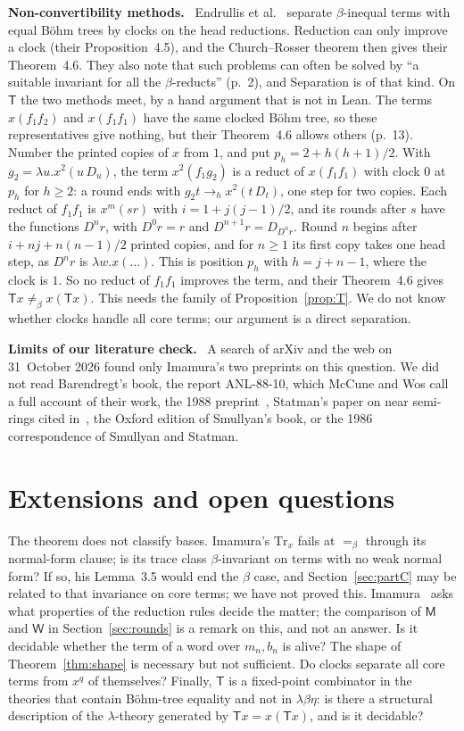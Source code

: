 \documentclass[a4paper,english]{lipics-v2021}
\newcommand{\M}{\mathsf{M}}
\newcommand{\W}{\mathsf{W}}
\newcommand{\T}{\mathsf{T}}
\newcommand{\hred}{\to_{h}}
\newcommand{\eqb}{=_{\beta}}
\newcommand{\neqb}{\neq_{\beta}}
\newcommand{\Dd}[1]{D_{#1}}
\newcommand{\runin}[1]{\par\smallskip\noindent\textbf{#1}\ }
\begin{document}
\runin{Non-convertibility methods.} Endrullis et al.~\cite{endrullis} separate $\beta$-inequal terms with equal Böhm trees by clocks on the head reductions. Reduction can only improve a clock (their Proposition~4.5), and the Church--Rosser theorem then gives their Theorem~4.6. They also note that such problems can often be solved by ``a suitable invariant for all the $\beta$-reducts'' (p.~2), and Separation is of that kind. On $\T$ the two methods meet, by a hand argument that is not in Lean. The terms $x(f_1f_2)$ and $x(f_1f_1)$ have the same clocked Böhm tree, so these representatives give nothing, but their Theorem~4.6 allows others (p.~13). Number the printed copies of $x$ from $1$, and put $p_h = 2+h(h+1)/2$. With $g_2 = \lambda u.x^2(u\,\Dd{u})$, the term $x^2(f_1g_2)$ is a reduct of $x(f_1f_1)$ with clock $0$ at $p_h$ for $h \geq 2$: a round ends with $g_2t \hred x^2(t\,\Dd{t})$, one step for two copies. Each reduct of $f_1f_1$ is $x^m(sr)$ with $i = 1+j(j-1)/2$, and its rounds after $s$ have the functions $D^nr$, with $D^0r = r$ and $D^{n+1}r = \Dd{D^nr}$. Round $n$ begins after $i+nj+n(n-1)/2$ printed copies, and for $n \geq 1$ its first copy takes one head step, as $D^nr$ is $\lambda w.x(\ldots)$. This is position $p_h$ with $h = j+n-1$, where the clock is $1$. So no reduct of $f_1f_1$ improves the term, and their Theorem~4.6 gives $\T x \neqb x(\T x)$. This needs the family of Proposition~\ref{prop:T}. We do not know whether clocks handle all core terms; our argument is a direct separation.

\runin{Limits of our literature check.} A search of arXiv and the web on 31~October 2026 found only Imamura's two preprints on this question. We did not read Barendregt's book, the report ANL-88-10, which McCune and Wos call a full account of their work, the 1988 preprint~\cite{wosmccune88}, Statman's paper on near semi-rings cited in~\cite[p.~122]{statman2017}, the Oxford edition of Smullyan's book, or the 1986 correspondence of Smullyan and Statman.

\section{Extensions and open questions}\label{sec:limits}

The theorem does not classify bases. Imamura's $\mathrm{Tr}_x$ fails at $\eqb$ through its normal-form clause; is its trace class $\beta$-invariant on terms with no weak normal form? If so, his Lemma~3.5 would end the $\beta$ case, and Section~\ref{sec:partC} may be related to that invariance on core terms; we have not proved this. Imamura~\cite[Problem~5.1]{imamura2} asks what properties of the reduction rules decide the matter; the comparison of $\M$ and $\W$ in Section~\ref{sec:rounds} is a remark on this, and not an answer. Is it decidable whether the term of a word over $m_n,b_n$ is alive? The shape of Theorem~\ref{thm:shape} is necessary but not sufficient. Do clocks separate all core terms from $x^q$ of themselves? Finally, $\T$ is a fixed-point combinator in the theories that contain Böhm-tree equality and not in $\lambda\beta\eta$: is there a structural description of the $\lambda$-theory generated by $\T x = x(\T x)$, and is it decidable?
\end{document}
